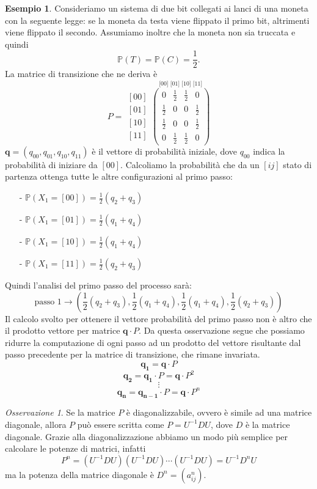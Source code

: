 \documentclass{article}
\theoremstyle{definition}
\newtheorem{example}[theorem]{Esempio}
\theoremstyle{remark}
\newtheorem{remark}[theorem]{Osservazione}
\begin{document}
\begin{example}
Consideriamo un sistema di due bit collegati ai lanci di una moneta con la seguente legge:
se la moneta da testa viene flippato il primo bit, altrimenti viene flippato il secondo. Assumiamo 
inoltre che la moneta non sia truccata e quindi
$$\mathbb{P}(T)= \mathbb{P}(C) = \frac{1}{2}.$$
La matrice di transizione che ne deriva è
$$P = \begin{matrix}
    [00]\\
    [01]\\
    [10]\\
    [11]
    \end{matrix}\overset{\text{[00] [01] [10] [11]}} 
    {\begin{pmatrix}
    0 &\frac{1}{2}&\frac{1}{2}&0\\
    \frac{1}{2}&0&0&\frac{1}{2}\\
    \frac{1}{2}&0&0&\frac{1}{2}\\
    0 &\frac{1}{2}&\frac{1}{2}&0
\end{pmatrix}}$$
$\boldsymbol{q}=(q_{00},q_{01},q_{10},q_{11})$ è il vettore di probabilità iniziale, dove $q_{00}$ indica la probabilità di iniziare da $[00]$.
Calcoliamo la probabilità che da un $[ij]$ stato di partenza ottenga tutte le altre configurazioni al primo passo:
\begin{itemize}
    \item [-]$\mathbb{P}(X_1=[00]) = \frac{1}{2}(q_2+q_3)$
    \item [-]$\mathbb{P}(X_1=[01]) = \frac{1}{2}(q_1+q_4)$
    \item [-]$\mathbb{P}(X_1=[10]) = \frac{1}{2}(q_1+q_4)$
    \item [-]$\mathbb{P}(X_1=[11]) = \frac{1}{2}(q_2+q_3)$
\end{itemize}
Quindi l'analisi del primo passo del processo sarà:
$$\text{passo 1} \to(\frac{1}{2}(q_2+q_3),\frac{1}{2}(q_1+q_4),\frac{1}{2}(q_1+q_4),\frac{1}{2}(q_2+q_3))$$
Il calcolo svolto per ottenere il vettore probabilità del primo passo non è altro che il prodotto vettore per matrice
$\boldsymbol{q} \cdot P$. Da questa osservazione segue che possiamo ridurre la computazione di ogni passo ad un prodotto del vettore 
risultante dal passo precedente per la matrice di transizione, che rimane invariata.
$$\boldsymbol{q_1} = \boldsymbol{q}\cdot P$$
$$\boldsymbol{q_2} =\boldsymbol{q_1}\cdot P= \boldsymbol{q}\cdot P^2$$
$$\vdots$$
$$\boldsymbol{q_n} = \boldsymbol{q_{n-1}}\cdot P = \boldsymbol{q}\cdot P^n$$
\end{example}
\begin{remark}
    Se la matrice $P$ è diagonalizzabile, ovvero è simile ad una matrice diagonale, allora $P$ può essere
    scritta come $P=U^{-1}DU$, dove $D$ è la matrice diagonale. Grazie alla diagonalizzazione abbiamo un modo
    più semplice per calcolare le potenze di matrici, infatti
    $$P^n = (U^{-1}DU)(U^{-1}DU)\dotsb (U^{-1}DU) = U^{-1}D^nU$$
    ma la potenza della matrice diagonale è $D^n = (a_{ij}^n)$.
\end{remark}
\end{document}
